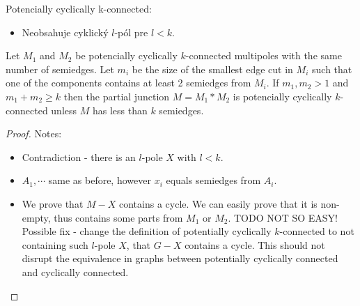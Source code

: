 \documentclass[12pt, twoside]{book}
\begin{document}
Potencially cyclically k-connected:
\begin{itemize}
	\item Neobsahuje cyklický $l$-pól pre $l<k$.
\end{itemize}

\begin{theorem}
	Let $M_1$ and $M_2$ be potencially cyclically $k$-connected multipoles with the same number of semiedges. Let $m_i$ be the size of the smallest edge cut in $M_i$ such that one of the components contains at least 2 semiedges from $M_i$. If $m_1,m_2>1$ and $m_1+m_2\geq k$ then the partial junction $M=M_1*M_2$ is potencially cyclically $k$-connected unless $M$ has less than $k$ semiedges.
\end{theorem}

\begin{proof}
	Notes:
	\begin{itemize}
		\item Contradiction - there is an $l$-pole $X$ with $l<k$.
		\item $A_1,\cdots$ same as before, however $x_i$ equals semiedges from $A_i$.
		\item We prove that $M-X$ contains a cycle. We can easily prove that it is non-empty, thus contains some parts from $M_1$ or $M_2$. TODO NOT SO EASY! Possible fix - change the definition of potentially cyclically $k$-connected to not containing such $l$-pole $X$, that $G-X$ contains a cycle. This should not disrupt the equivalence in graphs between potentially cyclically connected and cyclically connected.
		

\end{itemize}
\end{proof}
\end{document}
